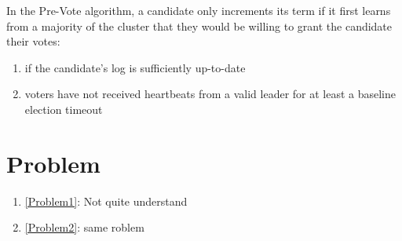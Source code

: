 \documentclass[11pt]{article}
\begin{document}
In the Pre-Vote algorithm, a candidate only increments its term if it first learns from a majority of
the cluster that they would be willing to grant the candidate their votes:
\begin{enumerate}
\item if the candidate's log is sufficiently up-to-date
\item voters have not received heartbeats from a valid leader for at least a baseline election timeout
\end{enumerate}
\section{Problem}
\label{sec:org8a2cab6}
\begin{enumerate}
\item \ref{Problem1}: Not quite understand
\item \ref{Problem2}: same roblem
\end{enumerate}
\end{document}
